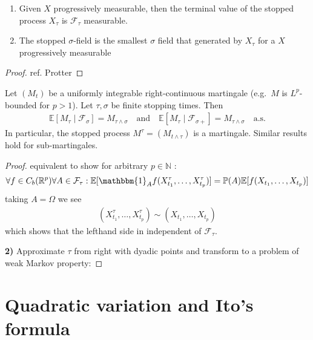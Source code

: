 \begin{proposition}
\quad
\begin{enumerate}
	\item Given $X$ progressively measurable, then the terminal value of the stopped process $X_\tau$ is $\mathcal{F}_\tau$ measurable. 
	\item The stopped $\sigma$-field is the smallest $\sigma$ field that generated by $X_\tau$ for a $X$ progressively measurable
\end{enumerate}
	
\end{proposition}
\begin{proof}
	ref. Protter 
\end{proof}

\begin{theorem}
	Let $(M_t)$ be a uniformly integrable right-continuous martingale (e.g.\ $M$ is $L^p$-bounded for $p > 1$). Let $\tau, \sigma$ be finite stopping times. Then
	\begin{align*}
		\mathbb{E}[M_\tau \mid \mathcal{F}_\sigma] = M_{\tau \wedge \sigma} \quad \text{and} \quad \mathbb{E}[M_\tau \mid \mathcal{F}_{\sigma+}] = M_{\tau \wedge \sigma} \quad \text{a.s.}
	\end{align*}
	In particular, the stopped process $M^\tau = (M_{t \wedge \tau})$ is a martingale. Similar results hold for sub-martingales.
\end{theorem}
\begin{proof}
equivalent to show for arbitrary $p \in \mathbb{N}$  :
\begin{align*}
	\forall f \in C_b(\mathbb{R}^p) \forall A \in \mathcal{F}_\tau:
	\mathbb{E} [\mathbbm{1}_A f(X^\tau_{t_1}, \dots, X^\tau_{t_p})] = \mathbb{P}(A)\mathbb{E}[f(X_{t_1}, \dots, X_{t_p})]
\end{align*}
taking $A = \Omega$ we see
\begin{align*}
	(X^\tau_{t_1}, \dots, X^\tau_{t_p}) \sim (X_{t_1}, \dots, X_{t_p})
\end{align*}
which shows that the lefthand side in independent of $\mathcal{F}_\tau$.

\textbf{2) }Approximate $\tau$ from right with dyadic points and transform to a problem of weak Markov property:
\end{proof}



\section{Quadratic variation and Ito's formula}

